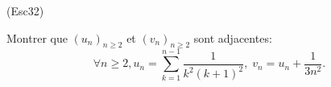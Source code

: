 \begin{tiny}(Esc32)\end{tiny} Montrer que $\left( u_n \right)_{n \geq 2}$  et $\left( v_n \right)_{n \geq 2}$ sont adjacentes:
\[
\forall n \geq 2, 
u_n = \sum_{k=1}^{n-1}\frac{1}{k^2(k+1)^2}, \;
v_n = u_n + \frac{1}{3n^2}.
\]
